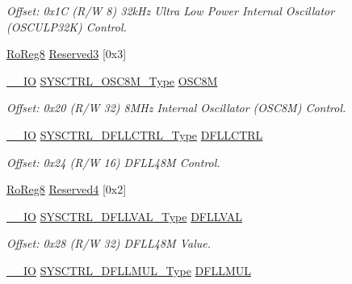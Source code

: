 \begin{DoxyCompactItemize}
\begin{DoxyCompactList}\small\item\em Offset\+: 0x1C (R/W 8) 32k\+Hz Ultra Low Power Internal Oscillator (O\+S\+C\+U\+L\+P32K) Control. \end{DoxyCompactList}\item 
\mbox{\hyperlink{group___s_a_m_d21_e15_a__definitions_ga0d957f1433aaf5d70e4dc2b68288442d}{Ro\+Reg8}} \mbox{\hyperlink{struct_sysctrl_ab22abf5c83fa4a01809facc55e0fda29}{Reserved3}} \mbox{[}0x3\mbox{]}
\item 
\mbox{\hyperlink{core__cm0plus_8h_aec43007d9998a0a0e01faede4133d6be}{\+\_\+\+\_\+\+IO}} \mbox{\hyperlink{union_s_y_s_c_t_r_l___o_s_c8_m___type}{S\+Y\+S\+C\+T\+R\+L\+\_\+\+O\+S\+C8\+M\+\_\+\+Type}} \mbox{\hyperlink{struct_sysctrl_aa2d62a994e2590b1a6df6dfacf67cc7a}{O\+S\+C8M}}
\begin{DoxyCompactList}\small\item\em Offset\+: 0x20 (R/W 32) 8M\+Hz Internal Oscillator (O\+S\+C8M) Control. \end{DoxyCompactList}\item 
\mbox{\hyperlink{core__cm0plus_8h_aec43007d9998a0a0e01faede4133d6be}{\+\_\+\+\_\+\+IO}} \mbox{\hyperlink{union_s_y_s_c_t_r_l___d_f_l_l_c_t_r_l___type}{S\+Y\+S\+C\+T\+R\+L\+\_\+\+D\+F\+L\+L\+C\+T\+R\+L\+\_\+\+Type}} \mbox{\hyperlink{struct_sysctrl_a012d1f947bb97eaa9d093d7a3870c783}{D\+F\+L\+L\+C\+T\+RL}}
\begin{DoxyCompactList}\small\item\em Offset\+: 0x24 (R/W 16) D\+F\+L\+L48M Control. \end{DoxyCompactList}\item 
\mbox{\hyperlink{group___s_a_m_d21_e15_a__definitions_ga0d957f1433aaf5d70e4dc2b68288442d}{Ro\+Reg8}} \mbox{\hyperlink{struct_sysctrl_aec3221203f6f367a8473128fc2f5429e}{Reserved4}} \mbox{[}0x2\mbox{]}
\item 
\mbox{\hyperlink{core__cm0plus_8h_aec43007d9998a0a0e01faede4133d6be}{\+\_\+\+\_\+\+IO}} \mbox{\hyperlink{union_s_y_s_c_t_r_l___d_f_l_l_v_a_l___type}{S\+Y\+S\+C\+T\+R\+L\+\_\+\+D\+F\+L\+L\+V\+A\+L\+\_\+\+Type}} \mbox{\hyperlink{struct_sysctrl_a6dba2cdd1024de2cac3543ddccd3c78a}{D\+F\+L\+L\+V\+AL}}
\begin{DoxyCompactList}\small\item\em Offset\+: 0x28 (R/W 32) D\+F\+L\+L48M Value. \end{DoxyCompactList}\item 
\mbox{\hyperlink{core__cm0plus_8h_aec43007d9998a0a0e01faede4133d6be}{\+\_\+\+\_\+\+IO}} \mbox{\hyperlink{union_s_y_s_c_t_r_l___d_f_l_l_m_u_l___type}{S\+Y\+S\+C\+T\+R\+L\+\_\+\+D\+F\+L\+L\+M\+U\+L\+\_\+\+Type}} \mbox{\hyperlink{struct_sysctrl_a32426316b39e0cdc64c497f66f4cb270}{D\+F\+L\+L\+M\+UL}}

\end{DoxyCompactItemize}
